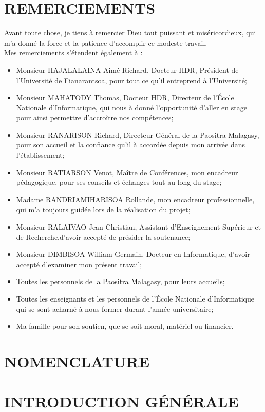 \documentclass[12pt]{report}
\begin{document}
			\chapter*{REMERCIEMENTS}
			\begin{minipage}{\textwidth}
				Avant toute chose, je tiens à remercier Dieu tout puissant et miséricordieux, qui m'a donné la force et la patience d'accomplir ce modeste travail.\\[0.5cm]
				Mes remerciements s’étendent également à :
				\begin{itemize}
					\item Monsieur HAJALALAINA Aimé Richard, Docteur HDR, Président de l'Université de Fianarantsoa, pour tout ce qu'il entreprend à l'Université;
					\item Monsieur MAHATODY Thomas, Docteur HDR, Directeur de l’École Nationale d'Informatique, qui nous à donné l'opportunité d'aller en stage pour ainsi permettre d’accroître nos compétences;
					\item Monsieur RANARISON Richard, Directeur Général de la Paositra Malagasy, pour son accueil et la confiance qu'il à accordée depuis mon arrivée dans l’établissement;
					\item Monsieur RATIARSON Venot, Maître de Conférences, mon encadreur pédagogique, pour ses conseils et échanges tout au long du stage;
					\item Madame RANDRIAMIHARISOA Rollande, mon encadreur professionnelle, qui m'a toujours guidée lors de la réalisation du projet;
					\item Monsieur RALAIVAO Jean Christian, Assistant d'Enseignement Supérieur et de Recherche,d’avoir accepté de présider la soutenance;
				 	\item Monsieur DIMBISOA William Germain, Docteur en Informatique, d'avoir accepté d'examiner mon présent travail;
					\item Toutes les personnels de la Paositra Malagasy, pour leurs accueils;
					\item Toutes les enseignants et les personnels de l’École Nationale d'Informatique qui se sont acharné à nous former durant l'année universitaire;
					\item Ma famille pour son soutien, que se soit moral, matériel ou financier.
				\end{itemize}
			\end{minipage}
			\newpage
			\tableofcontents
			\newpage
			\chapter*{NOMENCLATURE}
			\newpage
			\listoftables
			\newpage
			\listoffigures
			\newpage
			\newpage
			\setcounter{page}{1}
			\chapter*{INTRODUCTION GÉNÉRALE}
			\begin{minipage}{\textwidth}
							
			\end{minipage}
			\newpage
\end{document}
